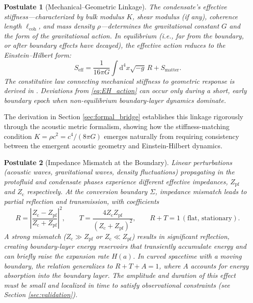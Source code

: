 \documentclass[11pt,a4paper]{article}
\newcommand{\dx}{\mathrm{d}}
\newcommand{\Zpf}{Z_{\mathrm{pf}}}
\newcommand{\Zcond}{Z_{\mathrm{c}}}
\newtheorem{postulate}{Postulate}
\theoremstyle{definition}
\begin{document}
\begin{postulate}[Mechanical--Geometric Linkage]
\label{post:mech_geo}
The condensate's effective stiffness---characterized by bulk modulus $K$, shear modulus (if any), coherence length $\ell_{\mathrm{coh}}$, and mass density $\rho$---determines the gravitational constant $G$ and the form of the gravitational action. In equilibrium (i.e., far from the boundary, or after boundary effects have decayed), the effective action reduces to the Einstein--Hilbert form:
\begin{equation}
\label{eq:EH_action}
S_{\mathrm{eff}} = \frac{1}{16\pi G} \int \dx^4 x \sqrt{-g} \, R + S_{\mathrm{matter}}.
\end{equation}
The constitutive law connecting mechanical stiffness to geometric response is derived in \cite{SkavbergMechG2025,SkavbergMechGR2025}. Deviations from \eqref{eq:EH_action} can occur only during a short, early boundary epoch when non-equilibrium boundary-layer dynamics dominate.
\end{postulate}

The derivation in Section \ref{sec:formal_bridge} establishes this linkage rigorously through the acoustic metric formalism, showing how the stiffness-matching condition $K = \rho c^2 = c^4/(8\pi G)$ emerges naturally from requiring consistency between the emergent acoustic geometry and Einstein-Hilbert dynamics.

\begin{postulate}[Impedance Mismatch at the Boundary]
\label{post:impedance}
Linear perturbations (acoustic waves, gravitational waves, density fluctuations) propagating in the protofluid and condensate phases experience different effective impedances, $\Zpf$ and $\Zcond$ respectively. At the conversion boundary $\Sigma$, impedance mismatch leads to partial reflection and transmission, with coefficients
\begin{equation}
\label{eq:reflection_transmission}
R = \left| \frac{\Zcond - \Zpf}{\Zcond + \Zpf} \right|^2, \qquad T = \frac{4 \Zcond \Zpf}{(\Zcond + \Zpf)^2}, \qquad R + T = 1 \, (\text{flat, stationary}).
\end{equation}
A strong mismatch ($\Zcond \gg \Zpf$ or $\Zcond \ll \Zpf$) results in significant reflection, creating \emph{boundary-layer energy reservoirs} that transiently accumulate energy and can briefly raise the expansion rate $H(a)$. In curved spacetime with a moving boundary, the relation generalizes to $R + T + A = 1$, where $A$ accounts for energy absorption into the boundary layer. The amplitude and duration of this effect must be small and localized in time to satisfy observational constraints (see Section \ref{sec:validation}).
\end{postulate}
\end{document}
